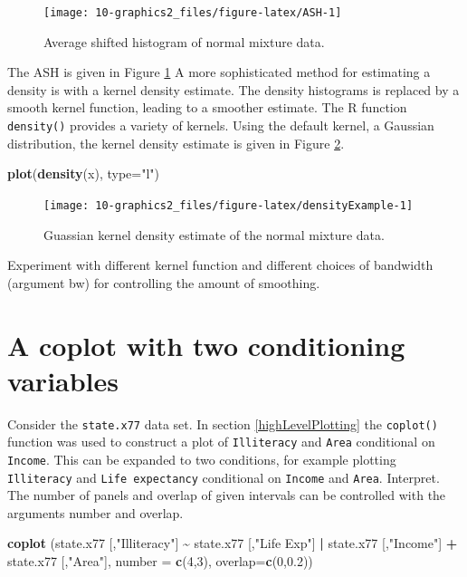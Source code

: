 \documentclass[
]{book}
\newenvironment{Shaded}{\begin{snugshade}}{\end{snugshade}}
\newcommand{\AttributeTok}[1]{\textcolor[rgb]{0.13,0.29,0.53}{#1}}
\newcommand{\DecValTok}[1]{\textcolor[rgb]{0.00,0.00,0.81}{#1}}
\newcommand{\FloatTok}[1]{\textcolor[rgb]{0.00,0.00,0.81}{#1}}
\newcommand{\FunctionTok}[1]{\textcolor[rgb]{0.13,0.29,0.53}{\textbf{#1}}}
\newcommand{\NormalTok}[1]{#1}
\newcommand{\SpecialCharTok}[1]{\textcolor[rgb]{0.81,0.36,0.00}{\textbf{#1}}}
\newcommand{\StringTok}[1]{\textcolor[rgb]{0.31,0.60,0.02}{#1}}
\begin{document}
\begin{figure}
\texttt{[image: 10-graphics2\_files/figure-latex/ASH-1]} \caption{Average shifted histogram of normal mixture data.}\label{fig:ASH}
\end{figure}

The ASH is given in Figure \ref{fig:ASH} A more sophisticated method for estimating a density is with a kernel density estimate. The density histograms is replaced by a smooth kernel function, leading to a smoother estimate. The R function \texttt{density()} provides a variety of kernels. Using the default kernel, a Gaussian distribution, the kernel density estimate is given in Figure \ref{fig:densityExample}.

\begin{Shaded}
\begin{Highlighting}[]
\FunctionTok{plot}\NormalTok{(}\FunctionTok{density}\NormalTok{(x), }\AttributeTok{type=}\StringTok{"l"}\NormalTok{)}
\end{Highlighting}
\end{Shaded}

\begin{figure}
\texttt{[image: 10-graphics2\_files/figure-latex/densityExample-1]} \caption{Guassian kernel density estimate of the normal mixture data.}\label{fig:densityExample}
\end{figure}

Experiment with different kernel function and different choices of bandwidth (argument bw) for controlling the amount of smoothing.

\section{A coplot with two conditioning variables}\label{coplot}

Consider the \texttt{state.x77} data set. In section \ref{highLevelPlotting} the \texttt{coplot()} function was used to construct a plot of \texttt{Illiteracy} and \texttt{Area} conditional on \texttt{Income}. This can be expanded to two conditions, for example plotting \texttt{Illiteracy} and \texttt{Life\ expectancy} conditional on \texttt{Income} and \texttt{Area}. Interpret. The number of panels and overlap of given intervals can be controlled with the arguments number and overlap.

\begin{Shaded}
\begin{Highlighting}[]
\FunctionTok{coplot}\NormalTok{ (state.x77 [,}\StringTok{"Illiteracy"}\NormalTok{] }\SpecialCharTok{\textasciitilde{}}\NormalTok{ state.x77 [,}\StringTok{"Life Exp"}\NormalTok{] }\SpecialCharTok{|} 
\NormalTok{                                   state.x77 [,}\StringTok{"Income"}\NormalTok{] }\SpecialCharTok{+}\NormalTok{ state.x77 [,}\StringTok{"Area"}\NormalTok{], }
                                \AttributeTok{number =} \FunctionTok{c}\NormalTok{(}\DecValTok{4}\NormalTok{,}\DecValTok{3}\NormalTok{), }\AttributeTok{overlap=}\FunctionTok{c}\NormalTok{(}\DecValTok{0}\NormalTok{,}\FloatTok{0.2}\NormalTok{))}
\end{Highlighting}
\end{Shaded}
\end{document}
